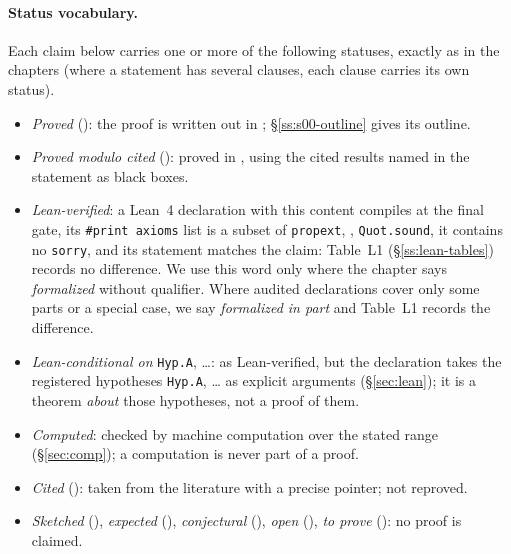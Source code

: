 
\paragraph{Status vocabulary.} Each claim below carries one or more of the following statuses, exactly as in the chapters
(where a statement has several clauses, each clause carries its own status).
\begin{itemize}
\item \emph{Proved} (\stproved): the proof is written out in \mainpdf{} \cite{LLmain}; \S\ref{ss:s00-outline} gives its outline.
\item \emph{Proved modulo cited} (\stpmc): proved in \mainpdf, using the cited results named in the statement as black boxes.
\item \emph{Lean-verified}: a Lean~4 declaration with this content compiles at the final gate, its \texttt{\#print axioms} list is a
  subset of \texttt{propext}, , \texttt{Quot.sound}, it contains no \texttt{sorry}, and its statement
  matches the claim: Table~L1 (\S\ref{ss:lean-tables}) records no difference. We use this word only where the chapter says
  \emph{formalized} without qualifier. Where audited declarations cover only some parts or a special case, we say
  \emph{formalized in part} and Table~L1 records the difference.
\item \emph{Lean-conditional on} \texttt{Hyp.A}, \dots: as Lean-verified, but the declaration takes the registered hypotheses
  \texttt{Hyp.A}, \dots{} as explicit arguments (\S\ref{sec:lean}); it is a theorem \emph{about} those hypotheses, not a proof of them.
\item \emph{Computed}: checked by machine computation over the stated range (\S\ref{sec:comp}); a computation is never part of a proof.
\item \emph{Cited} (\stcited): taken from the literature with a precise pointer; not reproved.
\item \emph{Sketched} (\stsketch), \emph{expected} (\stexp), \emph{conjectural} (\stconj), \emph{open} (\stopen), \emph{to prove} (\sttoprove): no proof is claimed.
\end{itemize}

